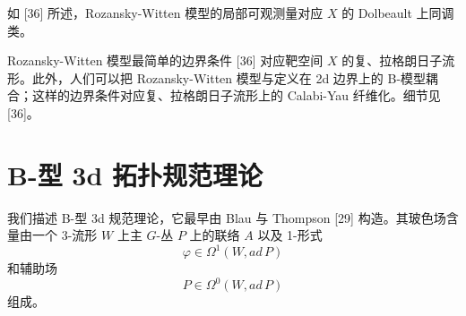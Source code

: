 
如 [36] 所述，Rozansky-Witten 模型的局部可观测量对应 $X$ 的 Dolbeault 上同调类。

Rozansky-Witten 模型最简单的边界条件 [36] 对应靶空间 $X$ 的复、拉格朗日子流形。此外，人们可以把 Rozansky-Witten 模型与定义在 2d 边界上的 B-模型耦合；这样的边界条件对应复、拉格朗日子流形上的 Calabi-Yau 纤维化。细节见 [36]。

\section{B-型 3d 拓扑规范理论}

我们描述 B-型 3d 规范理论，它最早由 Blau 与 Thompson [29] 构造。其玻色场含量由一个 3-流形 $W$ 上主 $G$-丛 $P$ 上的联络 $A$ 以及 1-形式
\[
  \varphi\in\Omega^1(W,\mathit{ad}\,P)
\]
和辅助场
\[
  P\in\Omega^0(W,\mathit{ad}\,P)
\]
组成。
